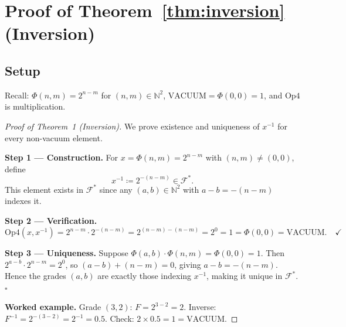 ﻿%



\section{Proof of Theorem~\ref{thm:inversion} (Inversion)}
\label{app:proofs-th1}

\subsection*{Setup}

Recall: $\Phi(n,m) = 2^{n-m}$ for $(n,m)\in\mathbb{N}^2$,
$\mathrm{VACUUM} = \Phi(0,0) = 1$, and $\mathrm{Op4}$ is multiplication.

\begin{proof}[Proof of Theorem~1 (Inversion)]
We prove existence and uniqueness of $x^{-1}$ for every non-vacuum element.

\medskip
\textbf{Step 1 --- Construction.}
For $x = \Phi(n,m) = 2^{n-m}$ with $(n,m)\neq(0,0)$, define
\[
  x^{-1} \coloneqq 2^{-(n-m)} \in \mathcal{F}^*.
\]
This element exists in $\mathcal{F}^*$ since any $(a,b) \in \mathbb{N}^2$ with $a-b = -(n-m)$ indexes it.

\textbf{Step 2 --- Verification.}
\[
  \mathrm{Op4}(x, x^{-1})
  = 2^{n-m} \cdot 2^{-(n-m)}
  = 2^{(n-m)-(n-m)}
  = 2^0
  = 1
  = \Phi(0,0)
  = \mathrm{VACUUM}. \quad\checkmark
\]

\textbf{Step 3 --- Uniqueness.}
Suppose $\Phi(a,b)\cdot \Phi(n,m) = \Phi(0,0) = 1$.
Then $2^{a-b}\cdot 2^{n-m} = 2^0$, so $(a-b)+(n-m)=0$, giving
$a-b = -(n-m)$.
Hence the grades $(a,b)$ are exactly those indexing $x^{-1}$, making it unique in $\mathcal{F}^*$. $\square$

\medskip
\textbf{Worked example.}
Grade $(3,2)$: $F = 2^{3-2} = 2$.
Inverse: $F^{-1} = 2^{-(3-2)} = 2^{-1} = 0.5$.
Check: $2 \times 0.5 = 1 = \mathrm{VACUUM}$.\quad\checkmark
\end{proof}

